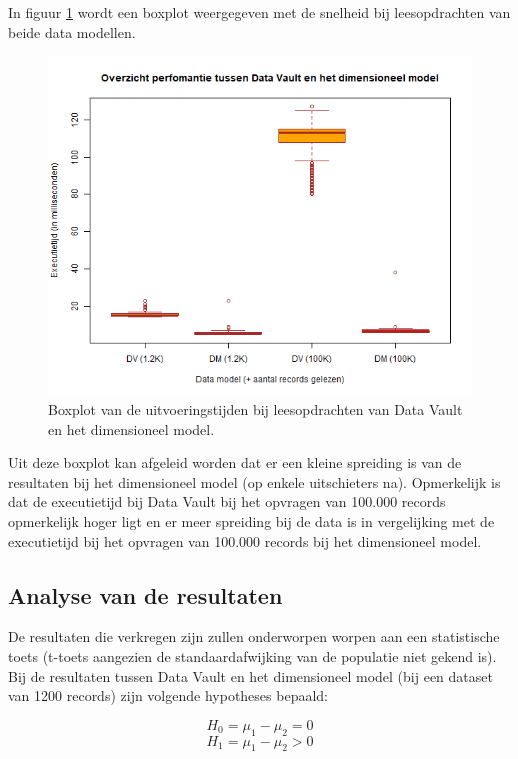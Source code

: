 In figuur \ref{fig:boxplotperf} wordt een boxplot weergegeven met de snelheid bij leesopdrachten van beide data modellen. 

\begin{figure}[H]
	\centering
	\includegraphics[scale=0.6]{../images/Score_perf.png}
	\caption{Boxplot van de uitvoeringstijden bij leesopdrachten van Data Vault en het dimensioneel model. }
	\label{fig:boxplotperf}
\end{figure}

Uit deze boxplot kan afgeleid worden dat er een kleine spreiding is van de resultaten bij het dimensioneel model (op enkele uitschieters na). Opmerkelijk is dat de executietijd bij Data Vault bij het opvragen van 100.000 records opmerkelijk hoger ligt en er meer spreiding bij de data is in vergelijking met de executietijd bij het opvragen van 100.000 records bij het dimensioneel model.

\subsection{Analyse van de resultaten}

De resultaten die verkregen zijn zullen onderworpen worpen aan een statistische toets (t-toets aangezien de standaardafwijking van de populatie niet gekend is). Bij de resultaten tussen Data Vault en het dimensioneel model (bij een dataset van 1200 records) zijn volgende hypotheses bepaald:

\[
H_0 = \mu_1 - \mu_2 = 0
\]
\[
H_1 = \mu_1 - \mu_2 > 0
\]

